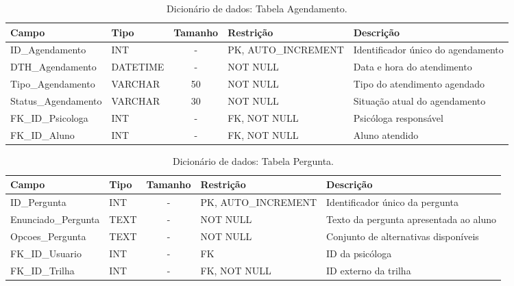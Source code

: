 \begin{table}[H]
    \centering
    \ABNTEXfontereduzida
    \caption[Dicionário de Dados - Tabela Agendamento]{Dicionário de dados: Tabela Agendamento.}
    \label{tab-tb-agendamento}
    \begin{tabular}{p{3.5cm}|p{2cm}|c|p{3.5cm}|p{4cm}}
    \textbf{Campo} & \textbf{Tipo} & \textbf{Tamanho} & \textbf{Restrição} & \textbf{Descrição} \\
    \hline
    ID\_Agendamento & INT & - & PK, AUTO\_INCREMENT & Identificador único do agendamento \\
    \hline
    DTH\_Agendamento & DATETIME & - & NOT NULL & Data e hora do atendimento \\
    \hline
    Tipo\_Agendamento & VARCHAR & 50 & NOT NULL & Tipo do atendimento agendado \\
    \hline
    Status\_Agendamento & VARCHAR & 30 & NOT NULL & Situação atual do agendamento \\
    \hline
    FK\_ID\_Psicologa & INT & - & FK, NOT NULL & Psicóloga responsável \\
    \hline
    FK\_ID\_Aluno & INT & - & FK, NOT NULL & Aluno atendido \\
    \end{tabular}
\end{table}

\begin{table}[H]
    \centering
    \ABNTEXfontereduzida
    \caption[Dicionário de Dados - Tabela Pergunta]{Dicionário de dados: Tabela Pergunta.}
    \label{tab-tb-pergunta}
    \begin{tabular}{p{3.5cm}|p{2cm}|c|p{3.5cm}|p{4cm}}
    \textbf{Campo} & \textbf{Tipo} & \textbf{Tamanho} & \textbf{Restrição} & \textbf{Descrição} \\
    \hline
    ID\_Pergunta & INT & - & PK, AUTO\_INCREMENT & Identificador único da pergunta \\
    \hline
    Enunciado\_Pergunta & TEXT & - & NOT NULL & Texto da pergunta apresentada ao aluno \\
    \hline
    Opcoes\_Pergunta & TEXT & - & NOT NULL & Conjunto de alternativas disponíveis \\
    \hline
    FK\_ID\_Usuario & INT & - & FK & ID da psicóloga \\
    \hline
    FK\_ID\_Trilha & INT & - & FK, NOT NULL & ID externo da trilha \\
    \end{tabular}
\end{table}

